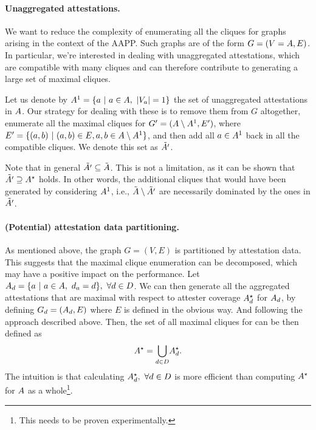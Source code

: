\documentclass{article}
\begin{document}
\paragraph{Unaggregated attestations.}
%
We want to reduce the complexity of enumerating all the cliques for graphs
arising in the context of the AAPP. Such graphs are of the form $G = (V =
A, E)$. In particular, we're interested in dealing with
unaggregated attestations, which are compatible with many cliques and can
therefore contribute to generating a large set of maximal cliques. 

Let us denote by $A^{1} = \{ a~|~a \in A,~
|V_{a}| = 1 \}$ the set of unaggregated attestations in
$A$. Our strategy for dealing with these is to remove them from $G$
altogether, enumerate all the maximal cliques for $G^{\prime} = (A
\setminus A^{1}, E^{\prime})$, where $E^{\prime} = \{ (a, b)~|~(a,
b) \in E, a, b \in A \setminus A^{1} \}$, and then add
all $a \in A^{1}$ back in all the compatible cliques. We
denote this set as $\tilde{A{}^{\prime}}$.

Note that in general $\tilde{A{}^{\prime}} \subseteq
\tilde{A{}}$. This is not a limitation, as it can be shown that
$\tilde{A{}^{\prime}} \supseteq A^{\star}$ holds. In
other words, the additional cliques that would have been generated by
considering $A^{1}$, i.e., $\tilde{A{}} \setminus
\tilde{A{}^{\prime}}$ are necessarily dominated by the ones in
$\tilde{A{}^{\prime}}$. 

\paragraph{(Potential) attestation data partitioning.}
%
As mentioned above, the graph $G = (V, E)$ is partitioned by attestation data.
This suggests that the maximal clique enumeration can be decomposed, which may
have a positive impact on the performance. Let $A_{d} = \{ a~|~a
\in A,~d_{a} = d \},~\forall d \in D$. We can then generate
all the aggregated attestations that are maximal with respect to attester
coverage $A_{d}^{\star}$ for $A_{d}$, by defining
$G_{d} = (A_{d}, E)$ where $E$ is defined in the obvious way. And
following the approach described above. Then, the set of all maximal cliques
for \attestations{} can be then defined as
%
\begin{equation}
  A^{\star} = \underset{d \in D}{\bigcup}
  A_{d}^{\star}.
\end{equation}
%
The intuition is that calculating $A_{d}^{\star},~\forall d \in
D$ is more efficient than computing $A^{\star}$ for
$A{}$ as a whole\footnote{This needs to be proven experimentally.}.
\end{document}
